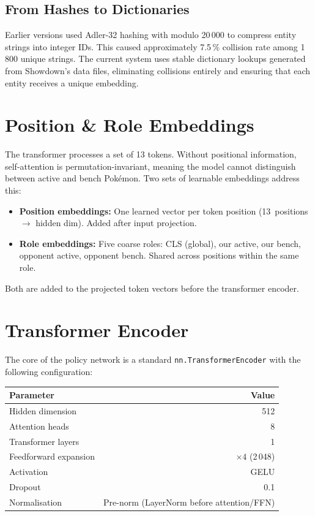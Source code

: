 \subsection{From Hashes to Dictionaries}

Earlier versions used Adler-32 hashing with modulo 20\,000 to compress entity
strings into integer IDs.  This caused approximately 7.5\,\% collision rate
among 1\,800 unique strings.  The current system uses stable dictionary
lookups generated from Showdown's data files, eliminating collisions entirely
and ensuring that each entity receives a unique embedding.

\section{Position \& Role Embeddings}

The transformer processes a set of 13 tokens.  Without positional information,
self-attention is permutation-invariant, meaning the model cannot distinguish between
active and bench Pok\'{e}mon.  Two sets of learnable embeddings address this:

\begin{itemize}
  \item \textbf{Position embeddings:} One learned vector per token position
        (13~positions $\to$ hidden dim).  Added after input projection.
  \item \textbf{Role embeddings:} Five coarse roles: CLS (global), our
        active, our bench, opponent active, opponent bench.  Shared across
        positions within the same role.
\end{itemize}

Both are added to the projected token vectors before the transformer encoder.

\section{Transformer Encoder}

The core of the policy network is a standard \texttt{nn.TransformerEncoder}
with the following configuration:

\begin{center}
\small
\begin{tabularx}{0.6\textwidth}{l r}
  \toprule
  \textbf{Parameter} & \textbf{Value} \\
  \midrule
  Hidden dimension     & 512 \\
  Attention heads      & 8 \\
  Transformer layers   & 1 \\
  Feedforward expansion & $\times 4$ (2\,048) \\
  Activation           & GELU \\
  Dropout              & 0.1 \\
  Normalisation        & Pre-norm (LayerNorm before attention/FFN) \\
  \bottomrule
\end{tabularx}
\end{center}

